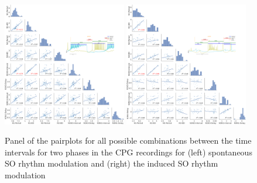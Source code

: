  
\begin{figure}[htbp]
	\centering
	\includegraphics[width=0.48\textwidth]{./img/invariants/data/SUSSEX/prep4_so_driven_2/images/panel_with_pairplot.png}
	\includegraphics[width=0.48\textwidth]{./img/invariants/data/SUSSEX/SO_driven/images/panel_with_pairplot.png}
	\caption{Panel of the pairplots for all possible combinations between the time intervals for two phases in the CPG recordings for (left) spontaneous SO rhythm modulation and (right) the induced SO rhythm modulation}
	\label{fig:so pairplot comparison}
\end{figure}

\newpage
